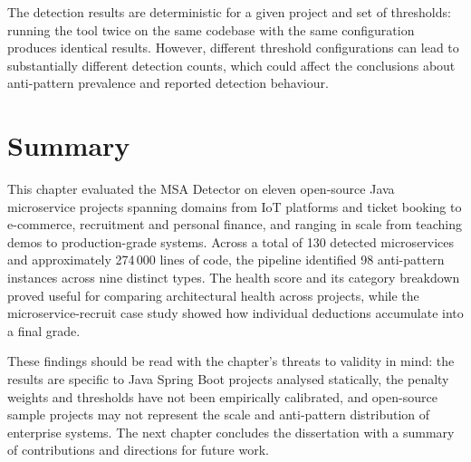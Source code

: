 \par The detection results are deterministic for a given project and set of thresholds: running the tool twice on the same codebase with the same configuration produces identical results. However, different threshold configurations can lead to substantially different detection counts, which could affect the conclusions about anti-pattern prevalence and reported detection behaviour.

\section{Summary}
\label{sec:ch5-summary}

\par This chapter evaluated the MSA Detector on eleven open-source Java microservice projects spanning domains from IoT platforms and ticket booking to e-commerce, recruitment and personal finance, and ranging in scale from teaching demos to production-grade systems. Across a total of 130 detected microservices and approximately 274\,000 lines of code, the pipeline identified 98 anti-pattern instances across nine distinct types. The health score and its category breakdown proved useful for comparing architectural health across projects, while the microservice-recruit case study showed how individual deductions accumulate into a final grade.

\par These findings should be read with the chapter's threats to validity in mind: the results are specific to Java Spring Boot projects analysed statically, the penalty weights and thresholds have not been empirically calibrated, and open-source sample projects may not represent the scale and anti-pattern distribution of enterprise systems. The next chapter concludes the dissertation with a summary of contributions and directions for future work.